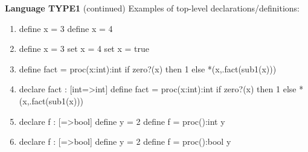 \begin{minipage}[t]{\sw}
\slidenumber
\LARGE
{\bf Language TYPE1} (continued)\exx
Examples of top-level declarations/definitions:
\Large
\begin{enumerate}
\setlength{\parskip}{.3ex}
\item
\begin{qv}
define x = 3 %
define x = 4 %
\end{qv}

\item
\begin{qv}
define x = 3 %
set x = 4    %
set x = true %
\end{qv}

\item
\begin{qv}
define fact = proc(x:int):int
  if zero?(x) then 1 else *(x,.fact(sub1(x)))
\end{qv}

\item
\begin{qv}
declare fact : [int=>int]
define fact = proc(x:int):int
  if zero?(x) then 1 else *(x,.fact(sub1(x))) %
\end{qv}

\item
\begin{qv}
declare f : [=>bool]
define y = 2
define f = proc():int y
\end{qv}

\item
\begin{qv}
declare f : [=>bool]
define y = 2
define f = proc():bool y
\end{qv}

\end{enumerate}
\end{minipage}
